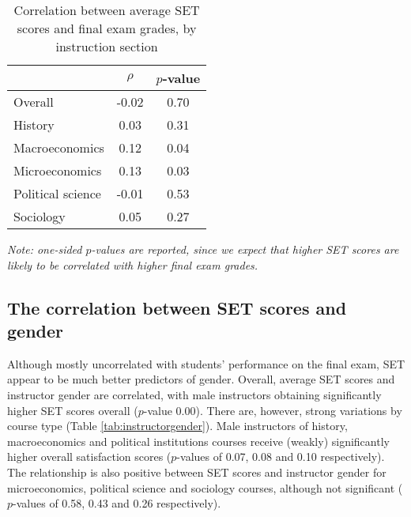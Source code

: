 \documentclass[12pt]{article}
\begin{document}
\begin{table}[htbp]
  \centering
  \footnotesize 
  \caption{Correlation between average SET scores and final exam grades, by instruction section}
    \begin{tabular}{lcc}
    \toprule 
                        & $\rho$  & $p$-value  \\
   \midrule
    Overall &            -0.02 &       0.70  \\
    History &             0.03 &       0.31  \\
    Macroeconomics &      0.12 &       0.04  \\
    Microeconomics &      0.13 &       0.03  \\
    Political science &  -0.01 &       0.53  \\
    Sociology &           0.05 &       0.27  \\
    \bottomrule
    \end{tabular}%
 \label{tab:finalexam}%
 
  \textit{Note: one-sided $p$-values are reported, since we expect that higher SET scores are likely to be correlated with higher final exam grades.}
\end{table}%
\normalsize




\subsection{The correlation between SET scores and gender}


Although mostly uncorrelated with students' performance on the final exam, SET appear to be much better predictors of gender. Overall, average SET scores and instructor gender are correlated, with male instructors obtaining significantly higher SET scores overall ($p$-value 0.00). There are, however, strong variations by course type (Table \ref{tab:instructorgender}). Male instructors of history, macroeconomics and political institutions courses receive (weakly) significantly higher overall satisfaction scores ($p$-values of 0.07, 0.08 and 0.10 respectively). The relationship is also positive between SET scores and instructor gender for microeconomics, political science and sociology courses, although not significant ($p$-values of 0.58, 0.43 and 0.26 respectively).   
\end{document}
